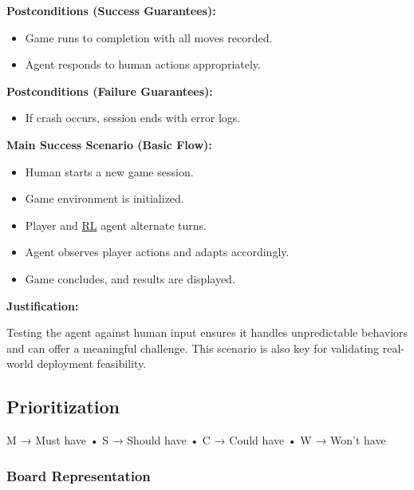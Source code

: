 \documentclass{article}
\newcommand{\RL}{\href{https://www.ibm.com/think/topics/reinforcement-learning}{RL}}
\begin{document}
\noindent\textbf{Postconditions (Success Guarantees):}
\begin{itemize}
    \item Game runs to completion with all moves recorded.
    \item Agent responds to human actions appropriately.
\end{itemize}

\noindent\textbf{Postconditions (Failure Guarantees):}
\begin{itemize}
    \item If crash occurs, session ends with error logs.
\end{itemize}

\noindent\textbf{Main Success Scenario (Basic Flow):}
\begin{itemize}
    \item Human starts a new game session.
    \item Game environment is initialized.
    \item Player and \RL{} agent alternate turns.
    \item Agent observes player actions and adapts accordingly.
    \item Game concludes, and results are displayed.
\end{itemize}

\noindent\textbf{Justification:}

Testing the agent against human input ensures it handles unpredictable behaviors and can offer a meaningful challenge. This scenario is also key for validating real-world deployment feasibility.



\subsection{Prioritization}\label{subsec:prioritization}
M → Must have
• S → Should have
• C → Could have
• W → Won't have 

\subsubsection*{Board Representation}
\end{document}
